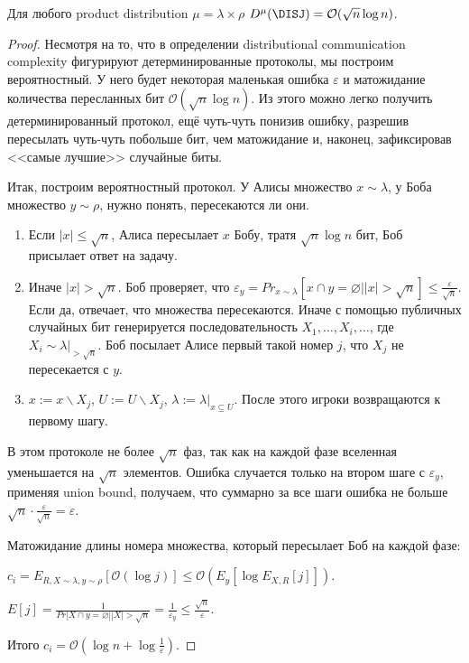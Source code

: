 \begin{theorem}
Для любого product distribution $\mu = \lambda \times \rho$ $D^{\mu}(\DISJ) = \mathcal{O}(\sqrt{n} \log{n})$.
\end{theorem}

\begin{proof}
Несмотря на то, что в определении distributional communication complexity фигурируют детерминированные протоколы, мы построим вероятностный. У него будет некоторая маленькая ошибка $\varepsilon$ и матожидание количества пересланных бит $\mathcal{O}(\sqrt{n}\log{n})$. Из этого можно легко получить детерминированный протокол, ещё чуть-чуть понизив ошибку, разрешив пересылать чуть-чуть побольше бит, чем матожидание и, наконец, зафиксировав <<самые лучшие>> случайные биты.

Итак, построим вероятностный протокол. У Алисы множество $x \sim \lambda$, у Боба множество $y \sim \rho$, нужно понять, пересекаются ли они.

\begin{enumerate}
    \item Если $|x| \leq \sqrt{n}$, Алиса пересылает $x$ Бобу, тратя $\sqrt{n}\log{n}$ бит, Боб присылает ответ на задачу.
    \item Иначе $|x| > \sqrt{n}$. Боб проверяет, что $\varepsilon_y = Pr_{x \sim \lambda} [x \cap y = \varnothing | |x| > \sqrt{n}] \leq \frac{\varepsilon}{\sqrt{n}}$. Если да, отвечает, что множества пересекаются. Иначе с помощью публичных случайных бит генерируется последовательность $X_1, \ldots, X_i, \ldots$, где $X_i \sim \lambda|_{> \sqrt{n}}$. Боб посылает Алисе первый такой номер $j$, что $X_j$ не пересекается с $y$.
    \item $x := x \backslash X_j$, $U := U \backslash X_j$, $\lambda := \lambda|_{x \subseteq U}$. После этого игроки возвращаются к первому шагу.
\end{enumerate}

В этом протоколе не более $\sqrt{n}$ фаз, так как на каждой фазе вселенная уменьшается на $\sqrt{n}$ элементов. Ошибка случается только на втором шаге с $\varepsilon_y$, применяя union bound, получаем, что суммарно за все шаги ошибка не больше $\sqrt{n} \cdot \frac{\varepsilon}{\sqrt{n}} = \varepsilon$.

Матожидание длины номера множества, который пересылает Боб на каждой фазе:

$c_i = E_{R, X \sim \lambda, y \sim \rho} [\mathcal{O}(\log{j})] \leq \mathcal{O}(E_y[\log{E_{X, R}[j]}])$.

$E[j] = \frac{1}{Pr[X \cap y = \varnothing | |X| > \sqrt{n}} = \frac{1}{\varepsilon_y} \leq \frac{\sqrt{n}}{\varepsilon}$.

Итого $c_i = \mathcal{O}(\log{n} + \log{\frac{1}{\varepsilon}})$.
\end{proof}